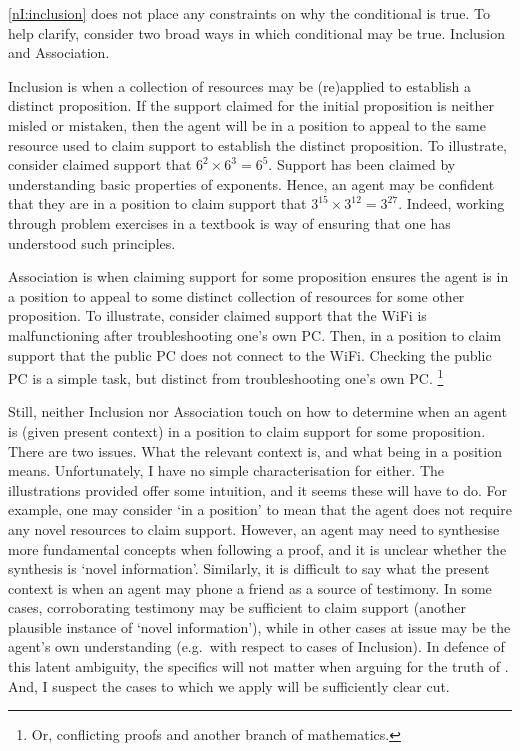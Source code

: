 \begin{note}
  \ref{nI:inclusion} does not place any constraints on why the conditional is true.
  To help clarify, consider two broad ways in which conditional may be true.
  Inclusion and Association.
\end{note}

\begin{note}[Inclusion]
  Inclusion is when a collection of resources may be (re)applied to establish a distinct proposition.
  If the support claimed for the initial proposition is neither misled or mistaken, then the agent will be in a position to appeal to the same resource used to claim support to establish the distinct proposition.
  To illustrate, consider claimed support that \(6^{2} \times 6^{3} = 6^{5}\).
  Support has been claimed by understanding basic properties of exponents.
  Hence, an agent may be confident that they are in a position to claim support that \(3^{15} \times 3^{12} = 3^{27}\).
  Indeed, working through problem exercises in a textbook is way of ensuring that one has understood such principles.
\end{note}

\begin{note}[Association]
  Association is when claiming support for some proposition ensures the agent is in a position to appeal to some distinct collection of resources for some other proposition.
  To illustrate, consider claimed support that the WiFi is malfunctioning after troubleshooting one's own PC.
  Then, in a position to claim support that the public PC does not connect to the WiFi.
  Checking the public PC is a simple task, but distinct from troubleshooting one's own PC.\nolinebreak
  \footnote{
    Or, conflicting proofs and another branch of mathematics.
  }
\end{note}

\begin{note}
  Still, neither Inclusion nor Association touch on how to determine when an agent is (given present context) in a position to claim support for some proposition.
  There are two issues.
  What the relevant context is, and what being in a position means.
  Unfortunately, I have no simple characterisation for either.
  The illustrations provided offer some intuition, and it seems these will have to do.
  For example, one may consider `in a position' to mean that the agent does not require any novel resources to claim support.
  However, an agent may need to synthesise more fundamental concepts when following a proof, and it is unclear whether the synthesis is `novel information'.
  Similarly, it is difficult to say what the present context is when an agent may phone a friend as a source of testimony.
  In some cases, corroborating testimony may be sufficient to claim support (another plausible instance of `novel information'), while in other cases at issue may be the agent's own understanding (e.g.\ with respect to cases of Inclusion).
  In defence of this latent ambiguity, the specifics will not matter when arguing for the truth of \nI{}.
  And, I suspect the cases to which we apply \nI{} will be sufficiently clear cut.
\end{note}


